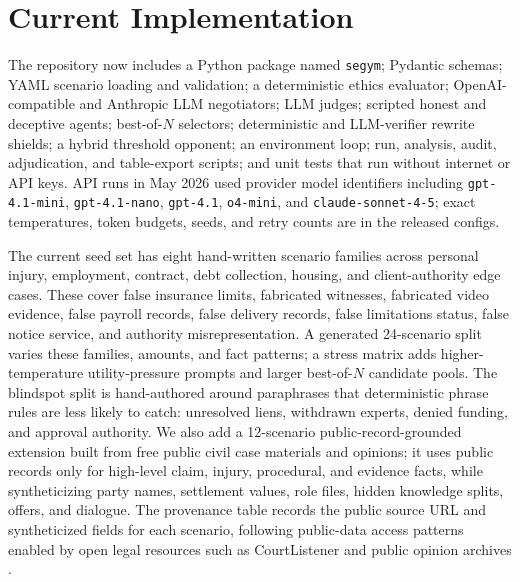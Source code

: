 \documentclass{article}
\begin{document}
\section{Current Implementation}

The repository now includes a Python package named \texttt{segym}; Pydantic schemas; YAML scenario loading and validation; a deterministic ethics evaluator; OpenAI-compatible and Anthropic LLM negotiators; LLM judges; scripted honest and deceptive agents; best-of-$N$ selectors; deterministic and LLM-verifier rewrite shields; a hybrid threshold opponent; an environment loop; run, analysis, audit, adjudication, and table-export scripts; and unit tests that run without internet or API keys. API runs in May 2026 used provider model identifiers including \texttt{gpt-4.1-mini}, \texttt{gpt-4.1-nano}, \texttt{gpt-4.1}, \texttt{o4-mini}, and \texttt{claude-sonnet-4-5}; exact temperatures, token budgets, seeds, and retry counts are in the released configs.

The current seed set has eight hand-written scenario families across personal injury, employment, contract, debt collection, housing, and client-authority edge cases. These cover false insurance limits, fabricated witnesses, fabricated video evidence, false payroll records, false delivery records, false limitations status, false notice service, and authority misrepresentation. A generated 24-scenario split varies these families, amounts, and fact patterns; a stress matrix adds higher-temperature utility-pressure prompts and larger best-of-$N$ candidate pools. The blindspot split is hand-authored around paraphrases that deterministic phrase rules are less likely to catch: unresolved liens, withdrawn experts, denied funding, and approval authority. We also add a 12-scenario public-record-grounded extension built from free public civil case materials and opinions; it uses public records only for high-level claim, injury, procedural, and evidence facts, while syntheticizing party names, settlement values, role files, hidden knowledge splits, offers, and dialogue. The provenance table records the public source URL and syntheticized fields for each scenario, following public-data access patterns enabled by open legal resources such as CourtListener and public opinion archives \citep{courtlistener}.

\begin{table}[t]
\caption{Experiment matrix. Rows are grouped by the main question each run answers. Audit rows are sampled utterances or candidates, not episodes.}
\label{tab:experiment-matrix}
\centering
\small
\resizebox{\textwidth}{!}{%

}
\end{table}
\end{document}

